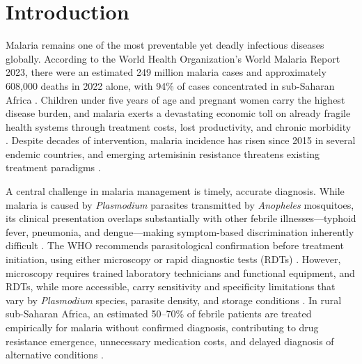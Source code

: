 \documentclass[12pt,a4paper]{article}
\begin{document}
\begin{abstract}
\textbf{Conclusions:} Integrating large language models with deterministic rule-based classification substantially improves malaria diagnostic accuracy while providing natural language clinical reasoning specific to each patient's reported symptoms. The offline, privacy-preserving, zero-cost architecture directly addresses key barriers to AI adoption in low- and middle-income country healthcare settings. Prospective clinical validation and multilingual support represent the primary directions for future development.

\vspace{0.5em}
\noindent\textbf{Keywords:} malaria diagnosis; clinical decision support systems; large language models; hybrid AI systems; explainable AI; resource-limited settings; global health informatics; Llama
\end{abstract}

\newpage

\section{Introduction}

Malaria remains one of the most preventable yet deadly infectious diseases globally. According to the World Health Organization's World Malaria Report 2023, there were an estimated 249 million malaria cases and approximately 608,000 deaths in 2022 alone, with 94\% of cases concentrated in sub-Saharan Africa \cite{ref10}. Children under five years of age and pregnant women carry the highest disease burden, and malaria exerts a devastating economic toll on already fragile health systems through treatment costs, lost productivity, and chronic morbidity \cite{ref23}. Despite decades of intervention, malaria incidence has risen since 2015 in several endemic countries, and emerging artemisinin resistance threatens existing treatment paradigms \cite{ref23}.

A central challenge in malaria management is timely, accurate diagnosis. While malaria is caused by \textit{Plasmodium} parasites transmitted by \textit{Anopheles} mosquitoes, its clinical presentation overlaps substantially with other febrile illnesses---typhoid fever, pneumonia, and dengue---making symptom-based discrimination inherently difficult \cite{ref18}. The WHO recommends parasitological confirmation before treatment initiation, using either microscopy or rapid diagnostic tests (RDTs) \cite{ref2}. However, microscopy requires trained laboratory technicians and functional equipment, and RDTs, while more accessible, carry sensitivity and specificity limitations that vary by \textit{Plasmodium} species, parasite density, and storage conditions \cite{ref11}. In rural sub-Saharan Africa, an estimated 50--70\% of febrile patients are treated empirically for malaria without confirmed diagnosis, contributing to drug resistance emergence, unnecessary medication costs, and delayed diagnosis of alternative conditions \cite{ref23}.
\end{document}
